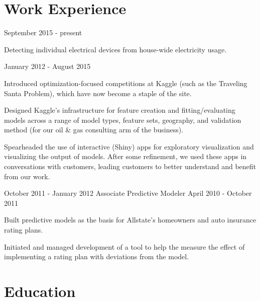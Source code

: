 \documentclass[letterpaper]{resume}
\author{David J. Chudzicki}
\begin{document}
\maketitle

\section{Work Experience}

{September 2015 - present}


\begin{compactitem}
\item Detecting individual electrical devices from house-wide electricity usage.
\end{compactitem}


{January 2012 - August 2015}            


\begin{compactitem}
\item Introduced optimization-focused competitions at Kaggle (such as the Traveling Santa Problem), which have now become a staple of the site.
\item Designed Kaggle's infrastructure for feature creation and fitting/evaluating models across a range of model types, feature sets, geography, and validation method (for our oil \& gas consulting arm of the business).
\item Spearheaded the use of interactive (Shiny) apps for exploratory visualization and visualizing the output of models. After some refinement, we used these apps in conversations with customers, leading customers to better understand and benefit from our work.
\end{compactitem}


{October 2011 - January 2012}
{Associate Predictive Modeler}
{April 2010 - October 2011}


\begin{compactitem}
\item Built predictive models as the basis for Allstate's homeowners and auto insurance rating plans.
\item Initiated and managed development of a tool to help the measure the effect of implementing a rating plan with deviations from the model.
\end{compactitem}

\section{Education}
\end{document}
